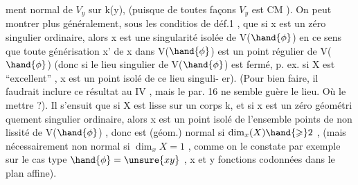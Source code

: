 
ment normal de $V_y$ sur k(y), (puisque de toutes façons   $V_y$ est CM ).
On peut montrer  plus généralement, sous les conditios de déf.1 , que si
x est un zéro singulier ordinaire, alors x est une singularité isolée
de V($\hand{\phi}$)  en ce sens que toute générisation  x' de x dans V($\hand{\phi}$) est un
point régulier de V($\hand{\phi}$)  (donc si le lieu singulier de V($\hand{\phi}$) est fermé, p.
ex. si X est ``excellent'' , x est  un point isolé de ce lieu singuli-%
er).  (Pour bien faire, il faudrait inclure ce résultat au 
IV , mais  le par. 16 ne semble guère le lieu. Où le mettre ?).  Il
s'ensuit que si X est lisse sur un corps k, et si x est un zéro géométri%
quement singulier ordinaire, alors  x est un point isolé de l'ensemble
 points de non lissité  de V($\hand{\phi}$) , donc est (géom.) normal si  $\dim_x(X) \hand{\geqslant} 2$ ,
(mais nécessairement non normal si $\dim_x X = 1$ , comme on le  constate par exemple sur
le cas type $\hand{\phi} = \unsure{xy}$ , x et y fonctions codonnées dans le plan affine).



